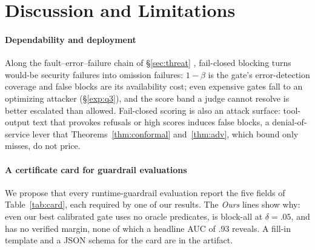 \section{Discussion and Limitations}\label{sec:disc}

\paragraph{Dependability and deployment}
Along the fault--error--failure chain of \S\ref{sec:threat} \citep{avizienis2004basic},
fail-closed blocking turns would-be security failures into omission failures: $1-\beta$ is the
gate's error-detection coverage and false blocks are its availability cost; even expensive gates
fall to an optimizing attacker (\S\ref{exp:q3}), and the score band a judge cannot resolve is
better escalated than allowed. Fail-closed scoring is also an attack
surface: tool-output text that provokes refusals or high scores induces false blocks, a
denial-of-service lever that Theorems~\ref{thm:conformal} and~\ref{thm:adv}, which bound only
misses, do not price.

\paragraph{A certificate card for guardrail evaluations}
We propose that every runtime-guardrail evaluation report the five fields of
Table~\ref{tab:card}, each required by one of our results. The \emph{Ours} lines show why:
even our best calibrated gate uses no oracle predicates, is block-all at $\delta=.05$, and has
no verified margin, none of which a headline AUC of $.93$ reveals. A fill-in template and a JSON
schema for the card are in the artifact.

